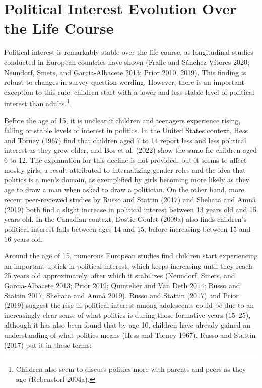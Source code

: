 \documentclass[
  letterpaper,
  DIV=11,
  numbers=noendperiod]{scrreprt}
\begin{document}
\section{Political Interest Evolution Over the Life
Course}\label{political-interest-evolution-over-the-life-course}

Political interest is remarkably stable over the life course, as
longitudinal studies conducted in European countries have shown (Fraile
and Sánchez-Vítores 2020; Neundorf, Smets, and Garcia-Albacete 2013;
Prior 2010, 2019). This finding is robust to changes in survey question
wording. However, there is an important exception to this rule: children
start with a lower and less stable level of political interest than
adults.\footnote{Children also seem to discuss politics more with
  parents and peers as they age (Rebenstorf 2004a).}

Before the age of 15, it is unclear if children and teenagers experience
rising, falling or stable levels of interest in politics. In the United
States context, Hess and Torney (1967) find that children aged 7 to 14
report less and less political interest as they grow older, and Bos et
al. (2022) show the same for children aged 6 to 12. The explanation for
this decline is not provided, but it seems to affect mostly girls, a
result attributed to internalizing gender roles and the idea that
politics is a men's domain, as exemplified by girls becoming more likely
as they age to draw a man when asked to draw a politician. On the other
hand, more recent peer-reviewed studies by Russo and Stattin (2017) and
Shehata and Amnå (2019) both find a slight increase in political
interest between 13 years old and 15 years old. In the Canadian context,
Dostie-Goulet (2009a) also finds children's political interest falls
between ages 14 and 15, before increasing between 15 and 16 years old.

Around the age of 15, numerous European studies find children start
experiencing an important uptick in political interest, which keeps
increasing until they reach 25 years old approximately, after which it
stabilizes (Neundorf, Smets, and Garcia-Albacete 2013; Prior 2019;
Quintelier and Van Deth 2014; Russo and Stattin 2017; Shehata and Amnå
2019). Russo and Stattin (2017) and Prior (2019) suggest the rise in
political interest among adolescents could be due to an increasingly
clear sense of what politics is during those formative years (15--25),
although it has also been found that by age 10, children have already
gained an understanding of what politics means (Hess and Torney 1967).
Russo and Stattin (2017) put it in these terms:
\end{document}
